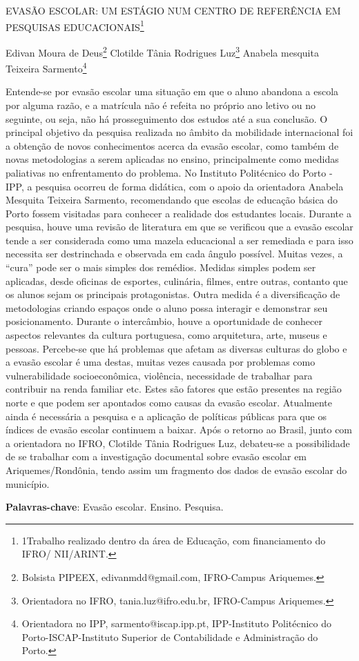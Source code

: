 \documentclass[article,12pt,onesidea,4paper,english,brazil]{abntex2}
\begin{document}
	
	
	\frenchspacing 
	
	\begin{center}
		\LARGE EVASÃO ESCOLAR: UM ESTÁGIO NUM CENTRO DE REFERÊNCIA EM PESQUISAS EDUCACIONAIS\footnote{1Trabalho realizado dentro da área de Educação, com financiamento do IFRO/ NII/ARINT.}
		
		\normalsize
	Edivan Moura de Deus\footnote{Bolsista PIPEEX, edivanmdd@gmail.com, IFRO-Campus Ariquemes.} 
	Clotilde Tânia Rodrigues Luz\footnote{Orientadora no IFRO, tania.luz@ifro.edu.br, IFRO-Campus Ariquemes.} 
	Anabela mesquita Teixeira Sarmento\footnote{Orientadora no IPP, sarmento@iscap.ipp.pt, IPP-Instituto Politécnico do Porto-ISCAP-Instituto Superior de Contabilidade e Administração do Porto.} 
	\end{center}
	
	\noindent Entende-se por evasão escolar uma situação em que o aluno abandona a escola por alguma razão, e a matrícula não é refeita no próprio ano letivo ou no seguinte, ou seja, não há prosseguimento dos estudos até a sua conclusão. O principal objetivo da pesquisa realizada no âmbito da mobilidade internacional foi a obtenção de novos conhecimentos acerca da evasão escolar, como também de novas metodologias a serem aplicadas no ensino, principalmente como medidas paliativas no enfrentamento do problema. No Instituto Politécnico do Porto - IPP, a pesquisa ocorreu de forma didática, com o apoio da orientadora Anabela Mesquita Teixeira Sarmento, recomendando que escolas de educação básica do Porto fossem visitadas para conhecer a realidade dos estudantes locais. Durante a pesquisa, houve uma revisão de literatura em que se verificou que a evasão escolar tende a ser considerada como uma mazela educacional a ser remediada e para isso necessita ser destrinchada e observada em cada ângulo possível. Muitas vezes, a “cura” pode ser o mais simples dos remédios. Medidas simples podem ser aplicadas, desde oficinas de esportes, culinária, filmes, entre outras, contanto que os alunos sejam os principais protagonistas. Outra medida é a diversificação de metodologias criando espaços onde o aluno possa interagir e demonstrar seu posicionamento. Durante o intercâmbio, houve a oportunidade de conhecer aspectos relevantes da cultura portuguesa, como arquitetura, arte, museus e pessoas. Percebe-se que há problemas que afetam as diversas culturas do globo e a evasão escolar é uma destas, muitas vezes causada por problemas como vulnerabilidade socioeconômica, violência, necessidade de trabalhar para contribuir na renda familiar etc. Estes são fatores que estão presentes na região norte e que podem ser apontados como causas da evasão escolar. Atualmente ainda é necessária a pesquisa e a aplicação de políticas públicas para que os índices de evasão escolar continuem a baixar. Após o retorno ao Brasil, junto com a orientadora no IFRO, Clotilde Tânia Rodrigues Luz, debateu-se a possibilidade de se trabalhar com a investigação documental sobre evasão escolar em Ariquemes/Rondônia, tendo assim um fragmento dos dados de evasão escolar do município.
	
	\vspace{\onelineskip}
	
	\noindent
	\textbf{Palavras-chave}: Evasão escolar. Ensino. Pesquisa.
	
\end{document}
